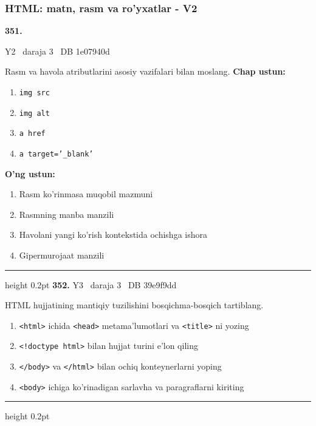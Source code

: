 \documentclass[10pt,a4paper,oneside]{article}
\begin{document}
\subsubsection{HTML: matn, rasm va ro'yxatlar - V2}
\hypertarget{q351}{\textbf{\color{ink}351.}}  {\color{muted}\scriptsize Y2 \textbullet\ daraja 3 \textbullet\ DB 1e07940d}
\par
Rasm va havola atributlarini asosiy vazifalari bilan moslang.
\textbf{\footnotesize Chap ustun:}
\begin{enumerate}[label=\arabic*),leftmargin=9mm]
\item \texttt{img src}
\item \texttt{img alt}
\item \texttt{a href}
\item \texttt{a target='\_blank'}
\end{enumerate}
\textbf{\footnotesize O'ng ustun:}
\begin{enumerate}[label=\Alph*),leftmargin=9mm]
\item Rasm ko'rinmasa muqobil mazmuni
\item Rasmning manba manzili
\item Havolani yangi ko'rish kontekstida ochishga ishora
\item Gipermurojaat manzili
\end{enumerate}
\vspace{2mm}\hrule height 0.2pt \vspace{4mm}
\hypertarget{q352}{\textbf{\color{ink}352.}}  {\color{muted}\scriptsize Y3 \textbullet\ daraja 3 \textbullet\ DB 39e9f9dd}
\par
HTML hujjatining mantiqiy tuzilishini bosqichma-bosqich tartiblang.
\begin{enumerate}[label=\Alph*),leftmargin=9mm]
\item \texttt{\textless{}html\textgreater{}} ichida \texttt{\textless{}head\textgreater{}} metama'lumotlari va \texttt{\textless{}title\textgreater{}} ni yozing
\item \texttt{\textless{}!doctype html\textgreater{}} bilan hujjat turini e'lon qiling
\item \texttt{\textless{}/body\textgreater{}} va \texttt{\textless{}/html\textgreater{}} bilan ochiq konteynerlarni yoping
\item \texttt{\textless{}body\textgreater{}} ichiga ko'rinadigan sarlavha va paragraflarni kiriting
\end{enumerate}
\vspace{2mm}\hrule height 0.2pt \vspace{4mm}
\end{document}
